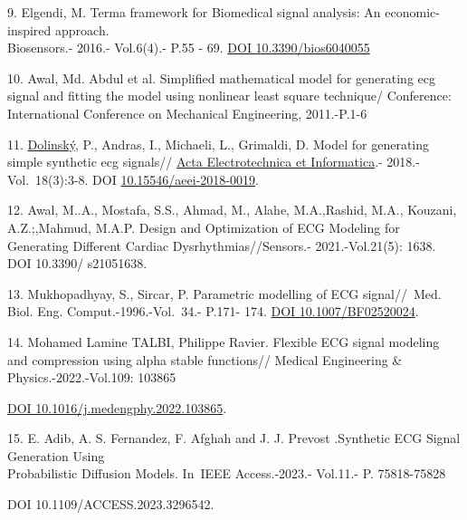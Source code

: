 \begin{references}
9. Elgendi, M. Terma framework for Biomedical signal analysis: An
economic-inspired approach. \\Biosensors.- 2016.- Vol.6(4).- P.55 - 69.
\href{https://doi.org/10.3390/bios6040055}{DOI 10.3390/bios6040055}

10. Awal, Md. Abdul et al. Simplified mathematical model for generating
ecg signal and fitting the model using nonlinear least square technique/
Conference: International Conference on Mechanical Engineering,
2011.-P.1-6

11.
\href{https://www.researchgate.net/scientific-contributions/Pavol-Dolinsky-2111486589?_sg\%5B0\%5D=OpDWPWB7F-xsKNW7QhdA72wrK8fp7beQ04-y1V0k2OSl-vY7yVCBibx1np_IexfBvwzs1tc.3cwJN3iOVCnhElwMBHi_44SzEhdGHYZWVIVDkbQ1O1b7A14CJ6y-CqFfnB303LWj8pCAkU8V0IFoKmFKiUohPw&_sg\%5B1\%5D=AVFGn2hkG-rhmm2v1aXJV9E-zSTVwesxqk3bJDU_jEY7VSRsfP3brCGDMfFzLd-5yvpDVx0.qPkk_lpV-CUBkVH8P4FChkQpEOFV8sRGeKQiTftWsOp6D_liXpE1YL21VpUyx-lJcgXk9ynFK7DYQ-rBYDhYVA}{Dolinský},
P., Andras, I., Michaeli, L., Grimaldi, D. Model for generating simple
synthetic ecg signals//
\href{https://www.researchgate.net/journal/Acta-Electrotechnica-et-Informatica-1338-3957?_tp=eyJjb250ZXh0Ijp7ImZpcnN0UGFnZSI6InB1YmxpY2F0aW9uIiwicGFnZSI6InB1YmxpY2F0aW9uIiwicG9zaXRpb24iOiJwYWdlSGVhZGVyIn19}{Acta
Electrotechnica et Informatica}.- 2018.-Vol.~18(3):3-8. DOI
\href{http://dx.doi.org/10.15546/aeei-2018-0019}{10.15546/aeei-2018-0019}.

12. Awal, M..A., Mostafa, S.S., Ahmad, M., Alahe, M.A.,Rashid, M.A.,
Kouzani, A.Z.;,Mahmud, M.A.P. Design and Optimization of ECG Modeling
for Generating Different Cardiac Dysrhythmias//Sensors.-
2021.-Vol.21(5): 1638. DOI 10.3390/ s21051638.

13. Mukhopadhyay, S., Sircar, P. Parametric modelling of ECG
signal//~Med. Biol. Eng. Comput.-1996.-Vol.~34.- P.171- 174.
\href{https://doi.org/10.1007/BF02520024}{DOI 10.1007/BF02520024}.

14. Mohamed Lamine TALBI, Philippe Ravier. Flexible ECG signal modeling
and compression using alpha stable functions// Medical Engineering \&
Physics.-2022.-Vol.109: 103865

\href{https://doi.org/10.1016/j.medengphy.2022.103865}{DOI
10.1016/j.medengphy.2022.103865}.

15. E. Adib, A. S. Fernandez, F. Afghah and J. J. Prevost .Synthetic ECG
Signal Generation Using \\Probabilistic Diffusion Models. In~IEEE
Access.-2023.- Vol.11.- P. 75818-75828

DOI 10.1109/ACCESS.2023.3296542.


\end{references}

